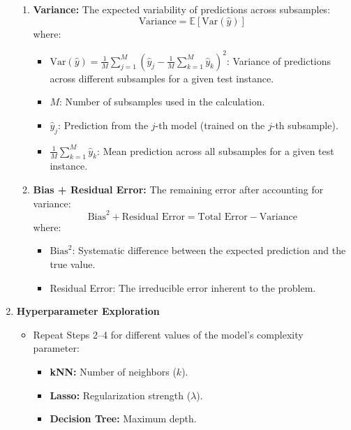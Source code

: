 \documentclass[a4paper,10pt]{article}
\begin{document}
\begin{enumerate}
\begin{enumerate}
    \item \textbf{Variance:} The expected variability of predictions across subsamples:
    \[
    \text{Variance} = \mathbb{E}\left[\text{Var}(\hat{y})\right]
    \]
    where:
    \begin{itemize}
    \item \(\text{Var}(\hat{y}) = \frac{1}{M} \sum_{j=1}^{M} \left(\hat{y}_j - \frac{1}{M} \sum_{k=1}^{M} \hat{y}_k \right)^2\): 
    Variance of predictions across different subsamples for a given test instance.
    \item \(M\): Number of subsamples used in the calculation.
    \item \(\hat{y}_j\): Prediction from the \(j\)-th model (trained on the \(j\)-th subsample).
    \item \(\frac{1}{M} \sum_{k=1}^{M} \hat{y}_k\): Mean prediction across all subsamples for a given test instance.
\end{itemize}


    \item \textbf{Bias + Residual Error:} The remaining error after accounting for variance:
    \[
    \text{Bias}^2 + \text{Residual Error} = \text{Total Error} - \text{Variance}
    \]
    where:
    \begin{itemize}
        \item \(\text{Bias}^2\): Systematic difference between the expected prediction and the true value.
        \item Residual Error: The irreducible error inherent to the problem.
    \end{itemize}
\end{enumerate}


    \item \textbf{Hyperparameter Exploration}
    \begin{itemize}
        \item Repeat Steps 2--4 for different values of the model's complexity parameter:
        \begin{itemize}
            \item \textbf{kNN:} Number of neighbors (\(k\)).
            \item \textbf{Lasso:} Regularization strength (\(\lambda\)).
            \item \textbf{Decision Tree:} Maximum depth.
        \end{itemize}
    \end{itemize}
    
\end{enumerate}
    
\end{document}

